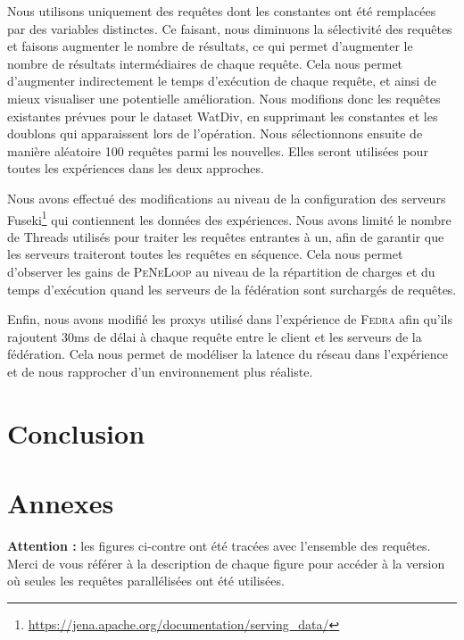 \documentclass[a4paper]{article}
\def\fedra{\textsc{Fedra}\xspace}
\def\peneloop{\textsc{PeNeLoop}\xspace}
\begin{document}
Nous utilisons uniquement des requêtes dont les constantes ont été remplacées par des variables distinctes. Ce faisant, nous diminuons la sélectivité des requêtes et faisons augmenter le nombre de résultats, ce qui permet d'augmenter le nombre de résultats intermédiaires de chaque requête. Cela nous permet d'augmenter indirectement le temps d'exécution de chaque requête, et ainsi de mieux visualiser une potentielle amélioration. Nous modifions donc les requêtes existantes prévues pour le dataset WatDiv, en supprimant les constantes et les doublons qui apparaissent lors de l'opération. Nous sélectionnons ensuite de manière aléatoire 100 requêtes parmi les nouvelles. Elles seront utilisées pour toutes les expériences dans les deux approches.

Nous avons effectué des modifications au niveau de la configuration des serveurs Fuseki\footnote{\url{https://jena.apache.org/documentation/serving_data/}} qui contiennent les données des expériences. Nous avons limité le nombre de Threads utilisés pour traiter les requêtes entrantes à un, afin de garantir que les serveurs traiteront toutes les requêtes en séquence. Cela nous permet d'observer les gains de \peneloop au niveau de la répartition de charges et du temps d'exécution quand les serveurs de la fédération sont surchargés de requêtes.

Enfin, nous avons modifié les proxys utilisé dans l'expérience de \fedra afin qu'ils rajoutent 30ms de délai à chaque requête entre le client et les serveurs de la fédération. Cela nous permet de modéliser la latence du réseau dans l'expérience et de nous rapprocher d'un environnement plus réaliste.

\section{Conclusion}




\section{Annexes}

\textbf{Attention :} les figures ci-contre ont été tracées avec l'ensemble des requêtes. Merci de vous référer à la description de chaque figure pour accéder à la version où seules les requêtes parallélisées ont été utilisées.
\end{document}
